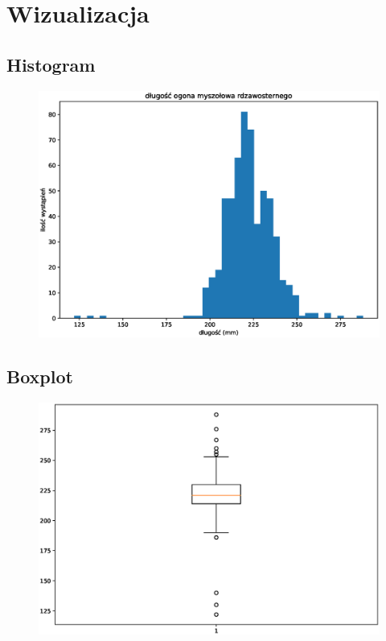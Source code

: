 \documentclass{article}
\theoremstyle{break}
\begin{document}
	\section{Wizualizacja}
	\subsection{Histogram}
	\begin{figure}[H]
		\includegraphics[scale=0.75]{HISTOGRAM.eps}
	\end{figure}
	\subsection{Boxplot}
	\begin{figure}[H]
		\includegraphics[scale=0.75]{BOXPLOT.eps}
	\end{figure}
\end{document}
